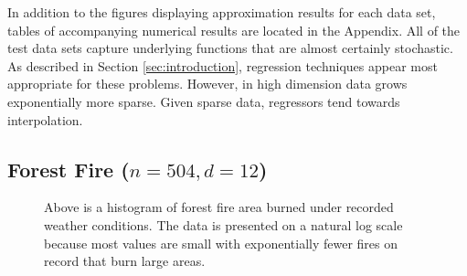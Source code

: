 \documentclass[smallextended,final]{svjour3}       %
\begin{document}
In addition to the figures displaying approximation results for each data set, tables of accompanying numerical results are located in the Appendix. All of the test data sets capture underlying functions that are almost certainly stochastic. As described in Section \ref{sec:introduction}, regression techniques appear most appropriate for these problems. However, in high dimension data grows exponentially more sparse. Given sparse data, regressors tend towards interpolation.

\subsection{Forest Fire ($n = 504, d = 12$)}

\begin{figure}
  \centering
  \caption{Above is a histogram of forest fire area burned under recorded weather conditions. The data is presented on a natural log scale because most values are small with exponentially fewer fires on record that burn large areas.}
  \label{fig:hist-forest-fire}
\end{figure}
\end{document}
